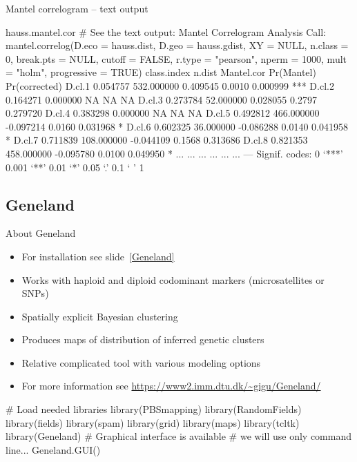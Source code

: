 \documentclass[compress, ucs, xelatex, 11pt, xcolor=svgnames,
  hyperref={
    bookmarks=true,
    unicode=true,
    colorlinks=true,
    pdftitle={Molecular data in R},
    plainpages=false,
    pdfauthor={Vojtech Zeisek},
    pdfsubject={Course about phylogeny and evolution in R},
    pdfcreator={XeLaTeX},
    pdfkeywords={R, evolution, phylogeny, molecular data},
    linkcolor=Tomato,
    anchorcolor=SaddleBrown,
    citecolor=Goldenrod,
    filecolor=DarkMagenta,
    menucolor=Sienna,
    urlcolor=DarkTurquoise,
    pdftex},
  url={hyphens, lowtilde} %
  ]{beamer}
\begin{document}
\begin{frame}[fragile]{Mantel correlogram -- text output}
  \begin{spluscode}
    hauss.mantel.cor # See the text output:
    Mantel Correlogram Analysis
    Call:
    mantel.correlog(D.eco = hauss.dist, D.geo = hauss.gdist, XY = NULL,
     n.class = 0, break.pts = NULL, cutoff = FALSE, r.type = "pearson",
     nperm = 1000, mult = "holm", progressive = TRUE) 
            class.index     n.dist Mantel.cor Pr(Mantel) Pr(corrected)
    D.cl.1     0.054757 532.000000   0.409545     0.0010      0.000999 ***
    D.cl.2     0.164271   0.000000         NA         NA            NA
    D.cl.3     0.273784  52.000000   0.028055     0.2797      0.279720
    D.cl.4     0.383298   0.000000         NA         NA            NA
    D.cl.5     0.492812 466.000000  -0.097214     0.0160      0.031968 *
    D.cl.6     0.602325  36.000000  -0.086288     0.0140      0.041958 *
    D.cl.7     0.711839 108.000000  -0.044109     0.1568      0.313686
    D.cl.8     0.821353 458.000000  -0.095780     0.0100      0.049950 *
       ...          ...        ...        ...        ...           ...
    ---
    Signif. codes:  0 ‘***’ 0.001 ‘**’ 0.01 ‘*’ 0.05 ‘.’ 0.1 ‘ ’ 1
  \end{spluscode}
\end{frame}

\subsection{Geneland}

\begin{frame}[fragile]{About Geneland}
\begin{multicols}{2}
  \label{GenelandUse}
  \begin{itemize}
    \item For installation see slide~\ref{Geneland}
    \item Works with haploid and diploid codominant markers (microsatellites or SNPs)
    \item Spatially explicit Bayesian clustering
    \item Produces maps of distribution of inferred genetic clusters
    \item Relative complicated tool with various modeling options
    \item For more information see \url{https://www2.imm.dtu.dk/~gigu/Geneland/}
  \end{itemize}
  \columnbreak
  \begin{spluscode} %
    # Load needed libraries
    library(PBSmapping)
    library(RandomFields)
    library(fields)
    library(spam)
    library(grid)
    library(maps)
    library(tcltk)
    library(Geneland)
    # Graphical interface is available
    # we will use only command line...
    Geneland.GUI()
  \end{spluscode}
\end{multicols}
\end{frame}
\end{document}
